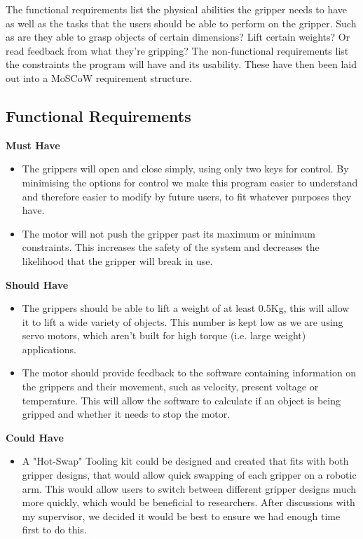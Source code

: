 \documentclass{l4proj}
\begin{document}
The functional requirements list the physical abilities the gripper needs to have as well as the tasks that the users should be able to perform on the gripper. Such as are they able to grasp objects of certain dimensions? Lift certain weights? Or read feedback from what they're gripping? The non-functional requirements list the constraints the program will have and its usability. These have then been laid out into a MoSCoW requirement structure.

\subsection{Functional Requirements}

\textbf{Must Have}
\begin{itemize}
	\item The grippers will open and close simply, using only two keys for control. By minimising the options for control we make this program easier to understand and therefore easier to modify by future users, to fit whatever purposes they have. 
	\item The motor will not push the gripper past its maximum or minimum constraints. This increases the safety of the system and decreases the likelihood that the gripper will break in use. 
	
\end{itemize}
\textbf{Should Have}
\begin{itemize}
	\item The grippers should be able to lift a weight of at least 0.5Kg, this will allow it to lift a wide variety of objects. This number is kept low as we are using servo motors, which aren't built for high torque (i.e. large weight) applications. 
	\item The motor should provide feedback to the software containing information on the grippers and their movement, such as velocity, present voltage or temperature. This will allow the software to calculate if an object is being gripped and whether it needs to stop the motor. 
\end{itemize}

\textbf{Could Have}
\begin{itemize}
	\item A "Hot-Swap" Tooling kit could be designed and created that fits with both gripper designs, that would allow quick swapping of each gripper on a robotic arm. This would allow users to switch between different gripper designs much more quickly, which would be beneficial to researchers. After discussions with my supervisor, we decided it would be best to ensure we had enough time first to do this. 
\end{itemize}
\end{document}
